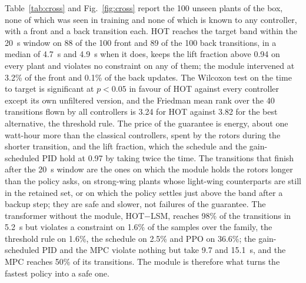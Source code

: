 \documentclass[final,5p,times,twocolumn]{elsarticle}
\newcommand{\bestOtherCrossName}{the threshold rule}
\newcommand{\bestOtherCrossRank}{3.82}
\newcommand{\hotCrossBackIntervPct}{0.1}
\newcommand{\hotCrossBackN}{100}
\newcommand{\hotCrossBackReached}{89}
\newcommand{\hotCrossBackTmed}{4.9}
\newcommand{\hotCrossFrontIntervPct}{3.2}
\newcommand{\hotCrossFrontN}{100}
\newcommand{\hotCrossFrontReached}{88}
\newcommand{\hotCrossFrontTmed}{4.7}
\newcommand{\hotCrossLf}{0.94}
\newcommand{\hotCrossRank}{3.24}
\newcommand{\hotnfCrossReached}{98\%}
\newcommand{\hotnfCrossT}{5.2}
\newcommand{\hotnfCrossViol}{1.6}
\newcommand{\mpcCrossReached}{50\%}
\newcommand{\mpcCrossT}{15.1}
\newcommand{\numCross}{100}
\newcommand{\numFriedmanN}{40}
\newcommand{\pidCrossT}{9.7}
\newcommand{\ppoCrossViol}{36.6}
\newcommand{\schCrossViol}{2.5}
\newcommand{\thrCrossViol}{1.6}
\begin{document}
Table~\ref{tab:cross} and Fig.~\ref{fig:cross} report the \numCross{} unseen plants of the box, none of which was seen in training and none of which is known to any controller, with a front and a back transition each. HOT reaches the target band within the \SI{20}{s} window on \hotCrossFrontReached{} of the \hotCrossFrontN{} front and \hotCrossBackReached{} of the \hotCrossBackN{} back transitions, in a median of \hotCrossFrontTmed{}~s and \hotCrossBackTmed{}~s when it does, keeps the lift fraction above \hotCrossLf{} on every plant and violates no constraint on any of them; the module intervened at \hotCrossFrontIntervPct{}\% of the front and \hotCrossBackIntervPct{}\% of the back updates. The Wilcoxon test on the time to target is significant at $p<0.05$ in favour of HOT against every controller except its own unfiltered version, and the Friedman mean rank over the \numFriedmanN{} transitions flown by all controllers is \hotCrossRank{} for HOT against \bestOtherCrossRank{} for the best alternative, \bestOtherCrossName{}. The price of the guarantee is energy, about one watt-hour more than the classical controllers, spent by the rotors during the shorter transition, and the lift fraction, which the schedule and the gain-scheduled PID hold at 0.97 by taking twice the time. The transitions that finish after the \SI{20}{s} window are the ones on which the module holds the rotors longer than the policy asks, on strong-wing plants whose light-wing counterparts are still in the retained set, or on which the policy settles just above the band after a backup step; they are safe and slower, not failures of the guarantee. The transformer without the module, HOT$-$LSM, reaches \hotnfCrossReached{} of the transitions in \hotnfCrossT{}~s but violates a constraint on \hotnfCrossViol{}\% of the samples over the family, the threshold rule on \thrCrossViol{}\%, the schedule on \schCrossViol{}\% and PPO on \ppoCrossViol{}\%; the gain-scheduled PID and the MPC violate nothing but take \pidCrossT{} and \mpcCrossT{}~s, and the MPC reaches \mpcCrossReached{} of its transitions. The module is therefore what turns the fastest policy into a safe one.
\end{document}
